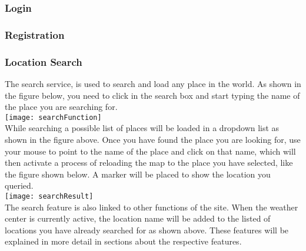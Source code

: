\subsubsection{Login}
\subsubsection{Registration}
\subsubsection{Location Search}
The search service, is used to search and load any place in the world. As shown in the figure below, you need to click in the search box and start typing the name of the place you are searching for. \\[0.5cm]
\texttt{[image: searchFunction]} \\[0.5cm]
While searching a possible list of places will be loaded in a dropdown list as shown in the figure above. Once you have found the place you are looking for, use your mouse to point to the name of the place and click on that name, which will then activate a process of reloading the map to the place you have selected, like the figure shown below. A marker will be placed to show the location you queried. \\[0.5cm]
\texttt{[image: searchResult]} \\[0.5cm]
The search feature is also linked to other functions of the site. When the weather center is currently active, the location name will be added to the listed of locations you have already searched for as shown above. These features will be explained in more detail in sections about the respective features.
